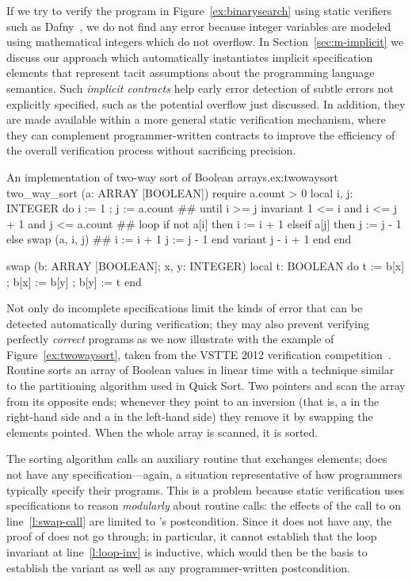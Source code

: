 If we try to verify the program in Figure~\ref{ex:binarysearch} using static verifiers such as Dafny~\cite{LEINO10}, we do not find any error because integer variables are modeled using mathematical integers which do not overflow.
In Section~\ref{sec:m-implicit} we discuss our approach which automatically instantiates implicit specification elements that represent tacit assumptions about the programming language semantics.
Such \emph{implicit contracts} help early error detection of subtle errors not explicitly specified, such as the potential overflow just discussed.
In addition, they are made available within a more general static verification mechanism, where they can complement programmer-written contracts to improve the efficiency of the overall verification process without sacrificing precision.


\begin{efigure}[ht]{An implementation of two-way sort of Boolean arrays.}{ex:twowaysort}
two_way_sort (a: ARRAY [BOOLEAN])
	require a.count > 0
	local i, j: INTEGER
	do
		i := 1 ; j := a.count #\label{l:init}#
		until	i >= j
		invariant 1 <= i and i <= j + 1 and j <= a.count #\label{l:loop-inv}#
		loop
			if not a[i] then
				i := i + 1
			elseif a[j] then
				j := j - 1
			else
				swap (a, i, j) #\label{l:swap-call}#
				i := i + 1
				j := j - 1
			end
		variant j - i + 1
		end
	end

swap (b: ARRAY [BOOLEAN]; x, y: INTEGER)
	local t: BOOLEAN
	do
		t := b[x] ; b[x] := b[y] ; b[y] := t
	end
\end{efigure}


Not only do incomplete specifications limit the kinds of error that can be detected automatically during verification; they may also prevent verifying perfectly \emph{correct} programs as we now illustrate with the example of Figure~\ref{ex:twowaysort}, taken from the VSTTE 2012 verification competition~\cite{FILLIATRE12}.
Routine  sorts an array  of Boolean values in linear time with a technique similar to the partitioning algorithm used in Quick Sort.
Two pointers  and  scan the array from its opposite ends; whenever they point to an inversion (that is, a  in the right-hand side and a  in the left-hand side) they remove it by swapping the elements pointed.
When the whole array is scanned, it is sorted.

The sorting algorithm calls an auxiliary routine  that exchanges elements;  does not have any specification---again, a situation representative of how programmers typically specify their programs.
This is a problem because static verification uses specifications to reason \emph{modularly} about routine calls: the effects of the call to  on line~\ref{l:swap-call} are limited to 's postcondition.
Since it does not have any, the proof of  does not go through; in particular, it cannot establish that the loop invariant at line~\ref{l:loop-inv} is inductive, which would then be the basis to establish the variant as well as any programmer-written postcondition.

